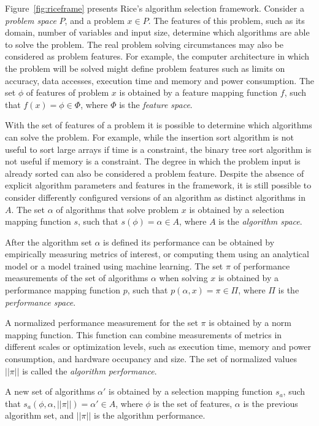 Figure~\ref{fig:riceframe} presents Rice's algorithm selection framework.
Consider a \textit{problem space} $P$, and a problem $x \in P$. The
features of this problem, such as its domain, number of variables and input
size, determine which algorithms are able to solve the problem. The real
problem solving circumstances may also be considered as problem features. For
example, the computer architecture in which the problem will be solved might
define problem features such as limits on accuracy, data accesses, execution
time and memory and power consumption.  The set $\phi$ of features of problem
$x$ is obtained by a feature mapping function $f$, such that $f(x) = \phi \in
\Phi$, where $\Phi$ is the \textit{feature space}.

With the set of features of a problem it is possible to determine which
algorithms can solve the problem. For example, while the insertion sort
algorithm is not useful to sort large arrays if time is a constraint, the
binary tree sort algorithm is not useful if memory is a constraint.  The degree
in which the problem input is already sorted can also be considered a
problem feature. Despite the absence of explicit algorithm parameters and
features in the framework, it is still possible to consider differently
configured versions of an algorithm as distinct algorithms in $A$.  The set
$\alpha$ of algorithms that solve problem $x$ is obtained by a selection
mapping function $s$, such that $s(\phi) = \alpha \in A$, where $A$ is the
\textit{algorithm space}.

After the algorithm set $\alpha$ is defined its performance can be obtained by
empirically measuring metrics of interest, or computing them using an
analytical model or a model trained using machine learning. The set $\pi$ of
performance measurements of the set of algorithms $\alpha$ when solving $x$ is
obtained by a performance mapping function $p$, such that $p(\alpha,x) = \pi
\in \Pi$, where $\Pi$ is the \textit{performance space}.

A normalized performance measurement for the set $\pi$ is obtained by a norm
mapping function. This function can combine measurements of metrics in
different scales or optimization levels, such as execution time, memory and
power consumption, and hardware occupancy and size. The set of normalized
values $||\pi||$ is called the \textit{algorithm performance}.

A new set of algorithms $\alpha{}'$ is obtained by a selection mapping function
$s_{a}$, such that $s_{a}(\phi,\alpha,||\pi||) = \alpha{}' \in A$, where $\phi$
is the set of features, $\alpha$ is the previous algorithm set, and $||\pi||$
is the algorithm performance.

